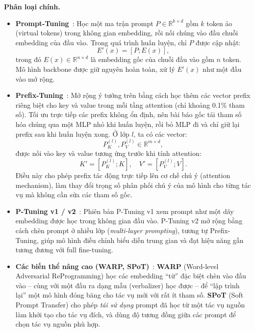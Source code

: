 \textbf{Phân loại chính.}
\begin{itemize}
	\item \textbf{Prompt-Tuning}~\cite{lester2021power}:  
	Học một ma trận prompt $P \in \mathbb{R}^{k \times d}$ gồm $k$ token ảo (virtual tokens) trong không gian embedding, rồi nối chúng vào đầu chuỗi embedding của đầu vào.  
	Trong quá trình huấn luyện, chỉ $P$ được cập nhật:
	\[
	E'(x) = [P; E(x)],
	\]
	trong đó $E(x) \in \mathbb{R}^{n \times d}$ là embedding gốc của chuỗi đầu vào gồm $n$ token.  
	Mô hình backbone được giữ nguyên hoàn toàn, xử lý $E'(x)$ như một đầu vào mở rộng.
	
	\item \textbf{Prefix-Tuning}~\cite{li2021prefix}:
	Mở rộng ý tưởng trên bằng cách học thêm các vector prefix riêng biệt cho key và value trong mỗi tầng attention (chỉ khoảng 0.1\% tham số). Tối ưu trực tiếp các prefix không ổn định, nên bài báo gốc tái tham số hóa chúng qua một MLP nhỏ khi huấn luyện, rồi bỏ MLP đi và chỉ giữ lại prefix sau khi huấn luyện xong.
	Ở lớp $l$, ta có các vector:
	\[
	P^{(l)}_K, P^{(l)}_V \in \mathbb{R}^{m \times d},
	\]
	được nối vào key và value tương ứng trước khi tính attention:
	\[
	K' = [P^{(l)}_K; K], \quad V' = [P^{(l)}_V; V].
	\]
	Điều này cho phép prefix tác động trực tiếp lên cơ chế chú ý (attention mechanism), làm thay đổi trọng số phân phối chú ý của mô hình cho từng tác vụ mà không cần sửa các tham số gốc.
	
	\item \textbf{P-Tuning v1 / v2}~\cite{liu2021p, liu2021ptuningv2}:  
	Phiên bản P-Tuning v1 xem prompt như một dãy embedding được học trong không gian đầu vào.  
	P-Tuning v2 mở rộng bằng cách chèn prompt ở nhiều lớp (\textit{multi-layer prompting}), tương tự Prefix-Tuning, giúp mô hình điều chỉnh biểu diễn trung gian và đạt hiệu năng gần tương đương với full fine-tuning.
	
	\item \textbf{Các biến thể nâng cao (WARP, SPoT)}~\cite{gheini2022warp, vu2022spot}:
	\textbf{WARP} (Word-level Adversarial ReProgramming) học các embedding “từ” đặc biệt chèn vào đầu vào -- cùng với một đầu ra dạng mẫu (verbalizer) học được -- để “lập trình lại” một mô hình đóng băng cho tác vụ mới với rất ít tham số.
	\textbf{SPoT} (Soft Prompt Transfer) cho phép \emph{tái sử dụng} prompt đã học từ một tác vụ nguồn làm khởi tạo cho tác vụ đích, và dùng độ tương đồng giữa các prompt để chọn tác vụ nguồn phù hợp.
\end{itemize}

